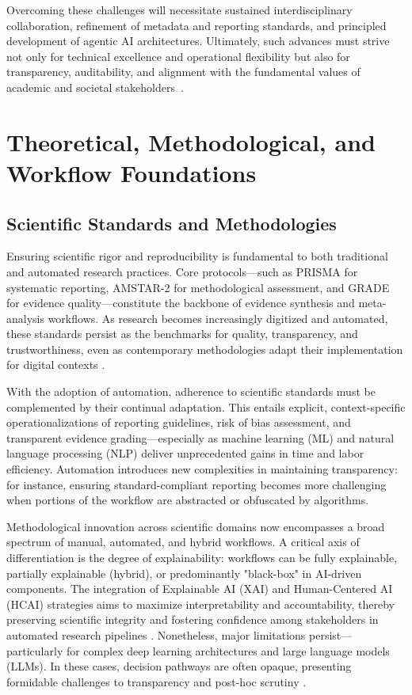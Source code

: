 Overcoming these challenges will necessitate sustained interdisciplinary collaboration, refinement of metadata and reporting standards, and principled development of agentic AI architectures. Ultimately, such advances must strive not only for technical excellence and operational flexibility but also for transparency, auditability, and alignment with the fundamental values of academic and societal stakeholders~\cite{ref101,ref102,ref103,ref104,ref105,ref106,ref111}.

\section{Theoretical, Methodological, and Workflow Foundations}

\subsection{Scientific Standards and Methodologies}

Ensuring scientific rigor and reproducibility is fundamental to both traditional and automated research practices. Core protocols—such as PRISMA for systematic reporting, AMSTAR-2 for methodological assessment, and GRADE for evidence quality—constitute the backbone of evidence synthesis and meta-analysis workflows. As research becomes increasingly digitized and automated, these standards persist as the benchmarks for quality, transparency, and trustworthiness, even as contemporary methodologies adapt their implementation for digital contexts \cite{ref1,ref2,ref5,ref9,ref10,ref28,ref29,ref30,ref31,ref37,ref38,ref43,ref51,ref61,ref62,ref63,ref78,ref80}.

With the adoption of automation, adherence to scientific standards must be complemented by their continual adaptation. This entails explicit, context-specific operationalizations of reporting guidelines, risk of bias assessment, and transparent evidence grading—especially as machine learning (ML) and natural language processing (NLP) deliver unprecedented gains in time and labor efficiency. Automation introduces new complexities in maintaining transparency: for instance, ensuring standard-compliant reporting becomes more challenging when portions of the workflow are abstracted or obfuscated by algorithms.

Methodological innovation across scientific domains now encompasses a broad spectrum of manual, automated, and hybrid workflows. A critical axis of differentiation is the degree of explainability: workflows can be fully explainable, partially explainable (hybrid), or predominantly "black-box" in AI-driven components. The integration of Explainable AI (XAI) and Human-Centered AI (HCAI) strategies aims to maximize interpretability and accountability, thereby preserving scientific integrity and fostering confidence among stakeholders in automated research pipelines \cite{ref51,ref64,ref80,ref81}. Nonetheless, major limitations persist—particularly for complex deep learning architectures and large language models (LLMs). In these cases, decision pathways are often opaque, presenting formidable challenges to transparency and post-hoc scrutiny \cite{ref76,ref78,ref80,ref91}.

